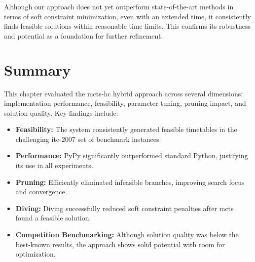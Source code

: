 Although our approach does not yet outperform state-of-the-art methods in terms of soft constraint minimization, even with an extended time, it consistently finds feasible solutions within reasonable time limits. This confirms its robustness and potential as a foundation for further refinement.

\section{Summary}

This chapter evaluated the \ac{mcts}-\ac{hc} hybrid approach across several dimensions: implementation performance, feasibility, parameter tuning, pruning impact, and solution quality. Key findings include:

\begin{itemize}
\item \textbf{Feasibility:} The system consistently generated feasible timetables in the challenging \ac{itc-2007} set of benchmark instances.

\item \textbf{Performance:} PyPy significantly outperformed standard Python, justifying its use in all experiments.

\item \textbf{Pruning:} Efficiently eliminated infeasible branches, improving search focus and convergence.

\item \textbf{Diving:} Diving successfully reduced soft constraint penalties after \ac{mcts} found a feasible solution.

\item \textbf{Competition Benchmarking:} Although solution quality was below the best-known results, the approach shows solid potential with room for optimization.
\end{itemize}